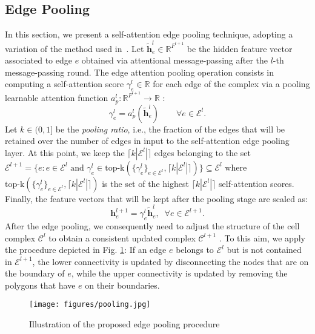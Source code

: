 \documentclass{article}
\begin{document}
\subsection{Edge Pooling} 

 In this section, we present a self-attention edge pooling technique, adopting a variation of the method used in~\cite{lee2019self}. Let $\widetilde{\mathbf{h}}_{e}^{l} \in \mathbb{R}^{F^{l+1}}$ be the hidden feature vector associated to edge $e$ obtained via attentional message-passing after the $l$-th message-passing round. The edge attention pooling operation consists in computing a self-attention score $\gamma_{e}^{l} \in \mathbb{R}$ for each edge of the complex via a pooling learnable attention function $a^l_{p}: \mathbb{R}^{F^{l+1}} \rightarrow \mathbb{R}$ : 
\begin{equation}\label{pooling_scores}
    \gamma_{e}^{l} = a^l_p \left(\widetilde{\mathbf{h}}_{e}^{l} \right) \qquad \forall e \in \mathcal{E}^l.
\end{equation}
Let $k \in (0, 1]$ be the \emph{pooling ratio}, i.e., the fraction of the edges that will be retained over the number of edges in input to the self-attention edge pooling layer. At this point, we keep the $\lceil k |\mathcal{E}^l| \rceil$ edges belonging to the set  $\mathcal{E}^{l+1} = \{ e  : e \in \mathcal{E}^l \textrm{ and } \gamma_e^{l} \in \text{top-k}(\{\gamma_{e}^{l}\}_{e \in \mathcal{E}^l}, \lceil k |\mathcal{E}^l| \rceil)  \} \subseteq \mathcal{E}^l$ where $\text{top-k}(\{\gamma^l_e\}_{e \in \mathcal{E}^l}, \lceil k |\mathcal{E}^l| \rceil)$ is the set of  the highest $\lceil k |\mathcal{E}^l| \rceil$ self-attention scores. Finally, the  feature vectors that will be kept after the pooling stage are scaled as:
\begin{equation}\label{pooling_scaling}
    \mathbf{h}_{e}^{l+1} =  \gamma_{e}^{l} \widetilde{\mathbf{h}}^{l}_{e} , \;\; \forall  e  \in \mathcal{E}^{l+1}.
\end{equation}
After the edge pooling, we consequently need  to adjust the structure of the cell complex $\mathcal{C}^l$ to obtain a consistent updated complex $\mathcal{C}^{l+1}$ . To this aim, we apply the procedure depicted in Fig. \ref{fig:pooling}: If an edge $e$ belongs to $\mathcal{E}^{l}$ but  is not contained in $ \mathcal{E}^{l+1}$, the lower connectivity is updated by disconnecting the nodes that are on the boundary of $e$, while the upper connectivity is updated by removing the polygons that have $e$ on their boundaries.

\begin{figure}[t]
    \centering
    \texttt{[image: figures/pooling.jpg]}
    \caption{Illustration of the proposed edge pooling procedure}
    \label{fig:pooling}
\end{figure}
\end{document}
